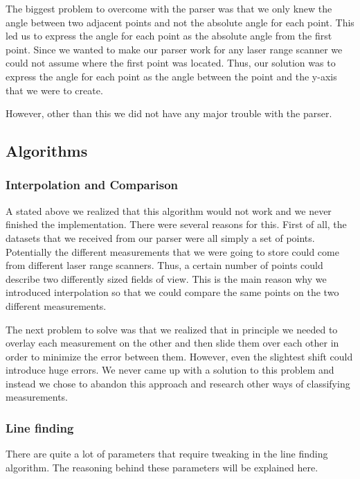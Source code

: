 \documentclass[a4paper, 10pt, conference]{ieeeconf}      %
\begin{document}
The biggest problem to overcome with the parser was that we only knew the angle between two adjacent points and not the absolute angle for each point. This led us to express the angle for each point as the absolute angle from the first point. Since we wanted to make our parser work for any laser range scanner we could not assume where the first point was located. Thus, our solution was to express the angle for each point as the angle between the point and the y-axis that we were to create.

However, other than this we did not have any major trouble with the parser.

\subsection{Algorithms}

\subsubsection{Interpolation and Comparison}
A stated above we realized that this algorithm would not work and we never finished the implementation. There were several reasons for this. First of all, the datasets that we received from our parser were all simply a set of points. Potentially the different measurements that we were going to store could come from different laser range scanners. Thus, a certain number of points could describe two differently sized fields of view. This is the main reason why we introduced interpolation so that we could compare the same points on the two different measurements.

The next problem to solve was that we realized that in principle we needed to overlay each measurement on the other and then slide them over each other in order to minimize the error between them. However, even the slightest shift could introduce huge errors. We never came up with a solution to this problem and instead we chose to abandon this approach and research other ways of classifying measurements.

\subsubsection{Line finding}
There are quite a lot of parameters that require tweaking in the line finding algorithm. The reasoning behind these parameters will be explained here.
\end{document}
